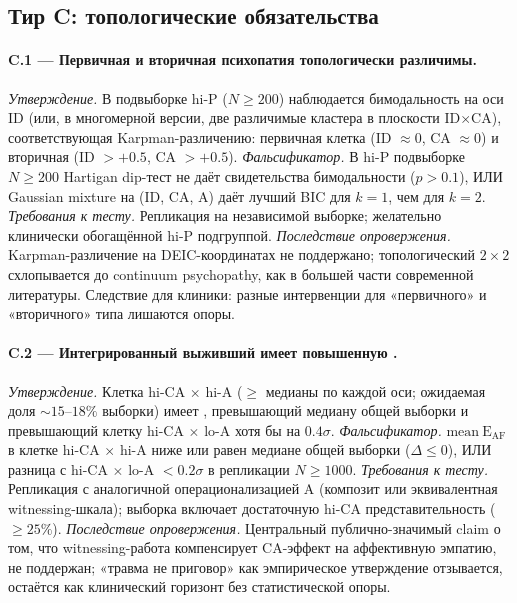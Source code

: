 \subsection{Тир C: топологические обязательства}
\label{subsec:falsification_tier_c}

\paragraph{C.1 --- Первичная и вторичная психопатия топологически различимы.}
\emph{Утверждение.} В подвыборке hi-P ($N \geq 200$) наблюдается бимодальность на оси ID (или, в многомерной версии, две различимые кластера в плоскости ID$\times$CA), соответствующая Karpman-различению: первичная клетка (ID $\approx 0$, CA $\approx 0$) и вторичная (ID $> +0.5$, CA $> +0.5$).
\emph{Фальсификатор.} В hi-P подвыборке $N \geq 200$ Hartigan dip-тест не даёт свидетельства бимодальности ($p > 0.1$), ИЛИ Gaussian mixture на (ID, CA, A) даёт лучший BIC для $k=1$, чем для $k=2$.
\emph{Требования к тесту.} Репликация на независимой выборке; желательно клинически обогащённой hi-P подгруппой.
\emph{Последствие опровержения.} Karpman-различение на DEIC-координатах не поддержано; топологический $2\times2$ схлопывается до continuum psychopathy, как в большей части современной литературы. Следствие для клиники: разные интервенции для «первичного» и «вторичного» типа лишаются опоры.

\paragraph{C.2 --- Интегрированный выживший имеет повышенную \EAF{}.}
\emph{Утверждение.} Клетка hi-CA $\times$ hi-A ($\geq$ медианы по каждой оси; ожидаемая доля $\sim 15$--$18\%$ выборки) имеет \EAF{}, превышающий медиану общей выборки и превышающий клетку hi-CA $\times$ lo-A хотя бы на $0.4\sigma$.
\emph{Фальсификатор.} $\mathrm{mean}\ \mathrm{E_{AF}}$ в клетке hi-CA $\times$ hi-A ниже или равен медиане общей выборки ($\Delta \leq 0$), ИЛИ разница с hi-CA $\times$ lo-A $< 0.2\sigma$ в репликации $N \geq 1000$.
\emph{Требования к тесту.} Репликация с аналогичной операционализацией A (композит или эквивалентная witnessing-шкала); выборка включает достаточную hi-CA представительность ($\geq 25\%$).
\emph{Последствие опровержения.} Центральный публично-значимый claim о том, что witnessing-работа компенсирует CA-эффект на аффективную эмпатию, не поддержан; «травма не приговор» как эмпирическое утверждение отзывается, остаётся как клинический горизонт без статистической опоры.

